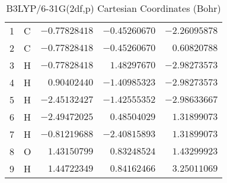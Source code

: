 \documentclass[10pt,oneside]{article}
\begin{document}
\begin{table}[h!]
\centering
\caption{B3LYP/6-31G(2df,p) Cartesian Coordinates (Bohr)}
\begin{tabular}{llrrr}
1  & C  & $-0.77828418$ & $-0.45260670$ & $-2.26095878$ \\
2  & C  & $-0.77828418$ & $-0.45260670$ & $ 0.60820788$ \\
3  & H  & $-0.77828418$ & $ 1.48297670$ & $-2.98273573$ \\
4  & H  & $ 0.90402440$ & $-1.40985323$ & $-2.98273573$ \\
5  & H  & $-2.45132427$ & $-1.42555352$ & $-2.98633667$ \\
6  & H  & $-2.49472025$ & $ 0.48504029$ & $ 1.31899073$ \\
7  & H  & $-0.81219688$ & $-2.40815893$ & $ 1.31899073$ \\
8  & O  & $ 1.43150799$ & $ 0.83248524$ & $ 1.43299923$ \\
9  & H  & $ 1.44722349$ & $ 0.84162466$ & $ 3.25011069$ \\
\end{tabular}
\end{table}

\clearpage
\end{document}
